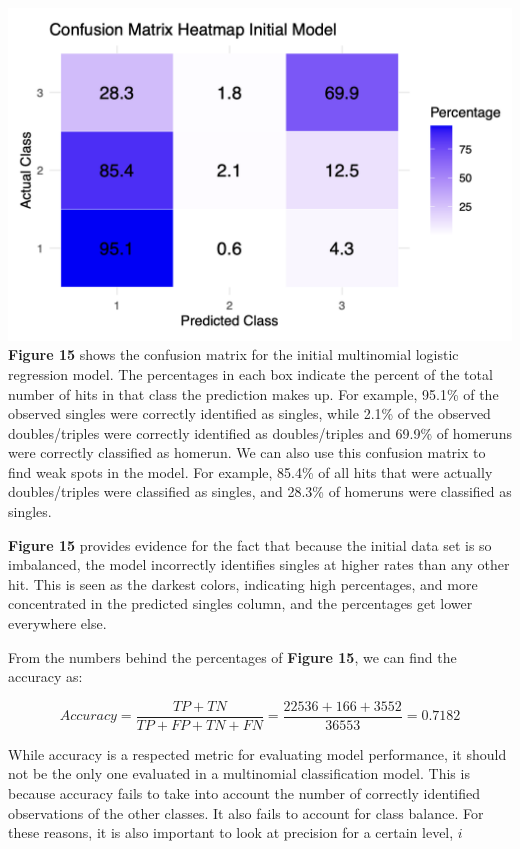 \documentclass[
  letterpaper,
  DIV=11,
  numbers=noendperiod]{scrartcl}
\begin{document}
\includegraphics{./images/figures/fig15.png} \textbf{Figure 15} shows
the confusion matrix for the initial multinomial logistic regression
model. The percentages in each box indicate the percent of the total
number of hits in that class the prediction makes up. For example,
95.1\% of the observed singles were correctly identified as singles,
while 2.1\% of the observed doubles/triples were correctly identified as
doubles/triples and 69.9\% of homeruns were correctly classified as
homerun. We can also use this confusion matrix to find weak spots in the
model. For example, 85.4\% of all hits that were actually
doubles/triples were classified as singles, and 28.3\% of homeruns were
classified as singles.

\textbf{Figure 15} provides evidence for the fact that because the
initial data set is so imbalanced, the model incorrectly identifies
singles at higher rates than any other hit. This is seen as the darkest
colors, indicating high percentages, and more concentrated in the
predicted singles column, and the percentages get lower everywhere else.

From the numbers behind the percentages of \textbf{Figure 15}, we can
find the accuracy as:

\[ Accuracy = \frac{TP + TN}{TP + FP + TN + FN} = \frac{22536 + 166 + 3552}{36553} = 0.7182\]

While accuracy is a respected metric for evaluating model performance,
it should not be the only one evaluated in a multinomial classification
model. This is because accuracy fails to take into account the number of
correctly identified observations of the other classes. It also fails to
account for class balance. For these reasons, it is also important to
look at precision for a certain level, \(i\)
\end{document}
